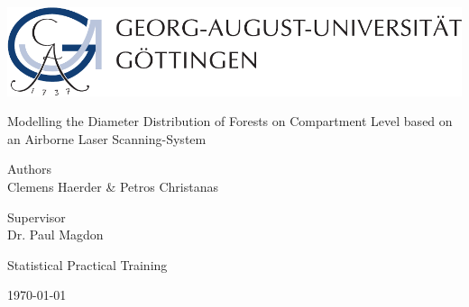 
\thispagestyle{empty}
\begin{center}


\begin{minipage}{0.75\linewidth}
    \centering
    \includegraphics[scale = 0.7]{figures/uni_goettingen_logo.pdf}\\
    
    \vspace{3cm}
    {{\LARGE Modelling the Diameter Distribution of Forests on Compartment Level based on an Airborne Laser Scanning-System\par}}
    \vspace{3cm}
\begin{center}
Authors\\
{\Large Clemens Haerder \& Petros Christanas} \\

\vspace{2cm}

Supervisor\\
{\large Dr. Paul Magdon}
\end{center}
    
    \vspace{2cm}
    {\Large Statistical Practical Training\par}
    \vspace{2cm}
    {\normalsize \today}
\end{minipage}
\end{center}
\clearpage